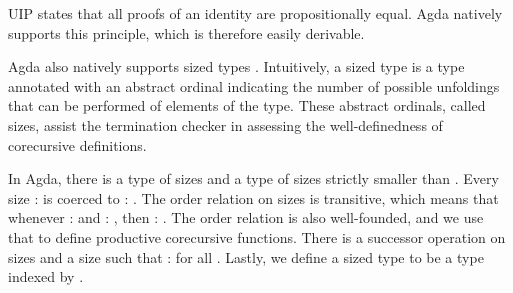 UIP states that all proofs of an identity are propositionally
equal. Agda natively supports this principle, which is therefore easily derivable.
\begin{code}%
\>[0]\AgdaSpace{}%
\AgdaSymbol{:}\AgdaSpace{}%
\AgdaSymbol{\{}\AgdaSpace{}%
\AgdaSymbol{:}\AgdaSpace{}%
\AgdaSymbol{\}}\AgdaSpace{}%
\AgdaSymbol{\{}\AgdaSpace{}%
\AgdaSpace{}%
\AgdaSymbol{:}\AgdaSpace{}%
\AgdaSymbol{\}}\AgdaSpace{}%
\AgdaSymbol{\{}\AgdaSpace{}%
\AgdaSpace{}%
\AgdaSymbol{:}\AgdaSpace{}%
\AgdaSpace{}%
\AgdaSpace{}%
\AgdaSymbol{\}}\AgdaSpace{}%
\AgdaSpace{}%
\AgdaSpace{}%
\AgdaSpace{}%
\<%
\end{code}

Agda also natively supports sized types
\cite{A-sized,AVW-normalization}. Intuitively, a sized type is a type
annotated with an abstract ordinal indicating the number of possible
unfoldings that can be performed of elements of the type.  These
abstract ordinals, called sizes, assist the termination checker in
assessing the well-definedness of corecursive definitions.

In Agda, there is a type  of sizes and a type   of
sizes strictly smaller than .  Every size  : 
 is coerced to  : . The order relation on sizes
is transitive, which means that whenever  :   and  : 
, then  :  .  The order relation is also
well-founded, and we use that to define productive corecursive
functions.
There is a successor operation  on sizes and a size  such that  :   for all
.
Lastly, we define a sized type to be a type indexed by .

